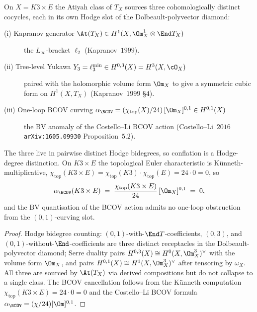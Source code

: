 \begin{proposition}[Three Atiyah cocycles on $K3 \times E$ are Hodge-disjoint; BCOV one-loop cancels via $\chi = 0$]
\label{prop:bl-three-atiyah-cocycles-k3e}
On $X = K3 \times E$ the Atiyah class of $T_X$ sources three cohomologically distinct cocycles, each in its own Hodge slot of the Dolbeault-polyvector diamond:
\begin{description}
 \item[\textup{(i)} Kapranov generator $\At(T_X) \in H^1(X, \Om^1_X \otimes \End T_X)$] the $L_\infty$-bracket $\ell_2$ \textup{(}Kapranov~$1999$\textup{)}.
 \item[\textup{(ii)} Tree-level Yukawa $Y_3 = \ell_3^{\min} \in H^{0, 3}(X) = H^3(X, \cO_X)$] paired with the holomorphic volume form $\Om_X$ to give a symmetric cubic form on $H^1(X, T_X)$ \textup{(}Kapranov~$1999$ \S$4$\textup{)}.
 \item[\textup{(iii)} One-loop BCOV curving $\alpha_\BCOV = (\chi_{\mathrm{top}}(X)/24)\,\lbrack\Om_X\rbrack^{0,1} \in H^{0,1}(X)$] the BV anomaly of the Costello--Li BCOV action \textup{(}Costello--Li~$2016$ \texttt{arXiv:1605.09930} Proposition~$5.2$\textup{)}.
\end{description}
The three live in pairwise distinct Hodge bidegrees, so conflation is a Hodge-degree distinction. On $K3 \times E$ the topological Euler characteristic is K\"unneth-multiplicative, $\chi_{\mathrm{top}}(K3 \times E) = \chi_{\mathrm{top}}(K3) \cdot \chi_{\mathrm{top}}(E) = 24 \cdot 0 = 0$, so
\[
 \alpha_\BCOV(K3 \times E) \;=\; \frac{\chi_{\mathrm{top}}(K3 \times E)}{24}\, \lbrack\Om_X\rbrack^{0, 1} \;=\; 0,
\]
and the BV quantisation of the BCOV action admits no one-loop obstruction from the $(0, 1)$-curving slot.
\end{proposition}

\begin{proof}
Hodge bidegree counting: $(0, 1)$-with-$\End T$-coefficients, $(0, 3)$, and $(0, 1)$-without-$\End$-coefficients are three distinct receptacles in the Dolbeault-polyvector diamond; Serre duality pairs $H^{0, 3}(X) \cong H^0(X, \Om^3_X)^\vee$ with the volume form $\Om_X$, and pairs $H^{0, 1}(X) \cong H^1(X, \Om^3_X)^\vee$ after tensoring by $\omega_X$. All three are sourced by $\At(T_X)$ via derived compositions but do not collapse to a single class. The BCOV cancellation follows from the K\"unneth computation $\chi_{\mathrm{top}}(K3 \times E) = 24 \cdot 0 = 0$ and the Costello--Li BCOV formula $\alpha_\BCOV = (\chi/24)[\Om]^{0,1}$.
\end{proof}

